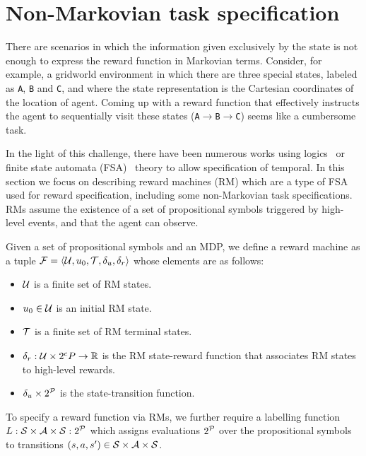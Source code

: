\section{Non-Markovian task specification}
\label{section:non_markovian}

There are scenarios in which the information given exclusively by the state is not enough to express the reward function in Markovian terms. Consider, for example, a gridworld environment in which there are three special states, labeled as \texttt{A}, \texttt{B} and \texttt{C}, and where the state representation is the Cartesian coordinates of the location of agent. Coming up with a reward function that effectively instructs the agent to sequentially visit these states (\texttt{A}$\rightarrow$\texttt{B}$\rightarrow$\texttt{C}) seems like a cumbersome task.

In the light of this challenge, there have been numerous works using logics~\citep{Camacho2019,DeGiacomo2019,Hasanbeig2018,Icarte2018b} or finite state automata (FSA)~\citep{Icarte2022,Furelos2023} theory to allow specification of temporal. In this section we focus on describing reward machines (RM) which are a type of FSA used for reward specification, including some non-Markovian task specifications. RMs assume the existence of a set of propositional symbols triggered by high-level events, and that the agent can observe. 

Given a set of propositional symbols and an MDP, we define a reward machine as a tuple $\mathcal{F}=\langle\mathcal{U}, u_0, \mathcal{T}, \delta_u, \delta_r\rangle$ whose elements are as follows:
\begin{itemize}
  \item $\mathcal{U}$ is a finite set of RM states.
  \item $u_0\in\mathcal{U}$ is an initial RM state.
  \item $\mathcal{T}$ is a finite set of RM terminal states.
  \item $\delta_r:\mathcal{U}\times2^cP\rightarrow \mathbb{R}$ is the RM state-reward function that associates RM states to high-level rewards.
  \item $\delta_u\times2^{\mathcal{P}}$ is the state-transition function.
\end{itemize}
To specify a reward function via RMs, we further require a labelling function $L:\mathcal{S}\times\mathcal{A}\times\mathcal{S}:2^{\mathcal{P}}$ which assigns evaluations $2^{\mathcal{P}}$ over the propositional symbols to transitions $(s, a, s')\in\mathcal{S}\times\mathcal{A}\times\mathcal{S}$.


